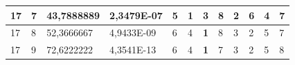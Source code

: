 \documentclass[conference]{IEEEtran}
\begin{document}
\begin{table}[]
\begin{tabular}{|llll|llllllll|}
\multicolumn{1}{|l|}{17}                                                    & \multicolumn{1}{l|}{7}                                                        & \multicolumn{1}{l|}{43,7888889}                                                   & 2,3479E-07                     & \multicolumn{1}{l|}{5}                                                  & \multicolumn{1}{l|}{\textbf{1}}                                         & \multicolumn{1}{l|}{3}                                                  & \multicolumn{1}{l|}{8}                                                  & \multicolumn{1}{l|}{2}                                                  & \multicolumn{1}{l|}{6}                                                  & \multicolumn{1}{l|}{4}                                                  & 7                          \\ \hline
\multicolumn{1}{|l|}{17}                                                    & \multicolumn{1}{l|}{8}                                                        & \multicolumn{1}{l|}{52,3666667}                                                   & 4,9433E-09                     & \multicolumn{1}{l|}{6}                                                  & \multicolumn{1}{l|}{4}                                                  & \multicolumn{1}{l|}{\textbf{1}}                                         & \multicolumn{1}{l|}{8}                                                  & \multicolumn{1}{l|}{3}                                                  & \multicolumn{1}{l|}{2}                                                  & \multicolumn{1}{l|}{5}                                                  & 7                          \\ \hline
\multicolumn{1}{|l|}{17}                                                    & \multicolumn{1}{l|}{9}                                                        & \multicolumn{1}{l|}{72,6222222}                                                   & 4,3541E-13                     & \multicolumn{1}{l|}{6}                                                  & \multicolumn{1}{l|}{4}                                                  & \multicolumn{1}{l|}{\textbf{1}}                                         & \multicolumn{1}{l|}{7}                                                  & \multicolumn{1}{l|}{3}                                                  & \multicolumn{1}{l|}{2}                                                  & \multicolumn{1}{l|}{5}                                                  & 8                          \\ \hline

\end{tabular}
\end{table}
\end{document}
